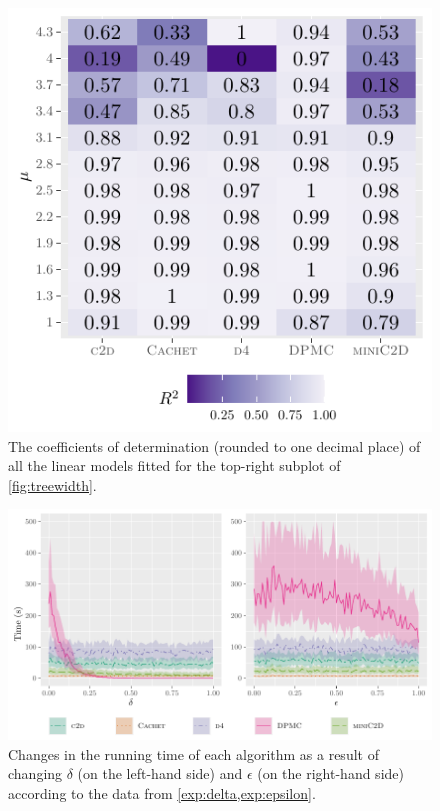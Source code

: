 \begin{figure}[t]
  \centering
  \includegraphics{chapters/comparison/r2}
  \caption{The coefficients of determination (rounded to one decimal place) of
    all the linear models fitted for the top-right subplot of
    \cref{fig:treewidth}.}\label{fig:r2}
\end{figure}

\begin{figure}[t]
  \centering
  \includegraphics{chapters/comparison/delta_epsilon}
  \caption{Changes in the running time of each algorithm as a result of changing
    $\delta$ (on the left-hand side) and $\epsilon$ (on the right-hand side)
    according to the data from
    \cref{exp:delta,exp:epsilon}.}\label{fig:delta_epsilon}
\end{figure}

